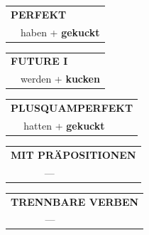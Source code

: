\documentclass[10pt,a4paper]{revtex4-2}
\begin{document}
\begin{verbbox}
    \vspace{10pt}

 \begin{tabular}{rl}
     \multicolumn{2}{l}{\textbf{PERFEKT}}\\
   & haben + \textbf{gekuckt}\\
  \end{tabular}
\hfill
   \begin{tabular}{rl}
   
    \multicolumn{2}{l}{\textbf{FUTURE I} }\\
   & werden + \textbf{kucken}\\
 
  \end{tabular}
\hfill
   \begin{tabular}{rl}
      \multicolumn{2}{l}{\textbf{PLUSQUAMPERFEKT}}\\
   & hatten + \textbf{gekuckt}\\
  \end{tabular}
  
  \vspace{10pt}



\begin{tabular}{lll}
\multicolumn{3}{l}{\textbf{MIT PRÄPOSITIONEN}}\\
& ---\\
\end{tabular}
\hfill
\begin{tabular}{lll}
\multicolumn{3}{l}{\textbf{TRENNBARE VERBEN}}\\
& ---\\
\end{tabular}

  \vspace{-5pt}
\end{verbbox}
\end{document}
